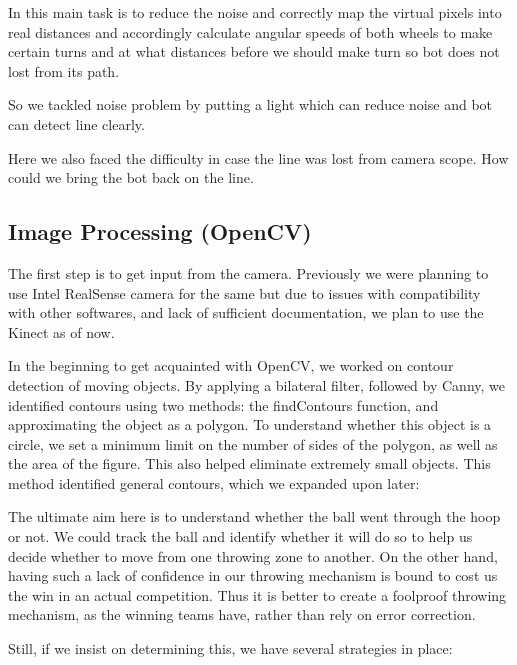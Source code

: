\documentclass[11pt]{article}
\begin{document}
In this main task is to reduce the noise and correctly map the virtual pixels into real distances and accordingly calculate angular speeds of both wheels to make certain turns and at what distances before we should  make turn so bot does not lost from its path.

So we tackled noise problem by putting a light which can reduce noise and bot can detect line clearly.

Here we also faced the difficulty in case the line was lost from camera scope. How could we bring the bot back on the line.

\subsection{Image Processing (OpenCV)}
The first step is to get input from the camera. Previously we were planning to use Intel RealSense camera for the same but due to issues with compatibility with other softwares, and lack of sufficient documentation, we plan to use the Kinect as of now.

In the beginning to get acquainted with OpenCV, we worked on contour detection of moving objects. By applying a bilateral filter, followed by Canny, we identified contours using two methods: the findContours function, and approximating the object as a polygon. To understand whether this object is a circle, we set a minimum limit on the number of sides of the polygon, as well as the area of the figure. This also helped eliminate extremely small objects. This method identified general contours, which we expanded upon later:

The ultimate aim here is to understand whether the ball went through the hoop or not. We could track the ball and identify whether it will do so to help us decide whether to move from one throwing zone to another. On the other hand, having such a lack of confidence in our throwing mechanism is bound to cost us the win in an actual competition. Thus it is better to create a foolproof throwing mechanism, as the winning teams have, rather than rely on error correction.

Still, if we insist on determining this, we have several strategies in place:
\end{document}
